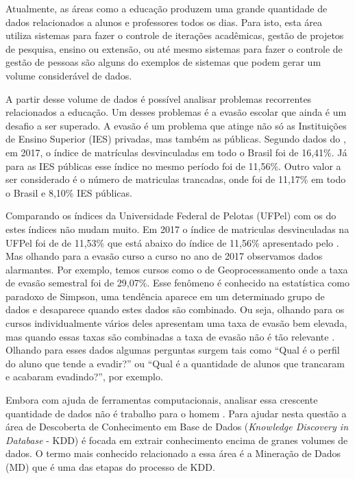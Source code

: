 \documentclass[diss,capa]{texufpel}
\begin{document}
Atualmente, as áreas como a educação produzem uma grande quantidade de dados relacionados a alunos e professores todos os dias.
Para isto, esta área utiliza sistemas para fazer o controle de iterações acadêmicas, gestão de projetos de pesquisa, ensino ou extensão, ou até mesmo sistemas para fazer o controle de gestão de pessoas são alguns do exemplos de sistemas que podem gerar um volume considerável de dados.

A partir desse volume de dados é possível analisar problemas recorrentes relacionados a educação.
Um desses problemas é a evasão escolar que ainda é um desafio a ser superado.
A evasão é um problema que atinge não só as Instituições de Ensino Superior (IES) privadas, mas também as públicas.
Segundo dados do \citet{inep:2018}, em 2017, o índice de matrículas desvinculadas em todo o Brasil foi de 16,41\%.
Já para as IES públicas esse índice no mesmo período foi de 11,56\%.
Outro valor a ser considerado é o número de matriculas trancadas, onde foi de 11,17\% em todo o Brasil e 8,10\% IES públicas.

Comparando os índices da Universidade Federal de Pelotas (UFPel) com os do \citet{inep:2018} estes índices não mudam muito.
Em 2017 o índice de matriculas desvinculadas na UFPel foi de de 11,53\% que está abaixo do índice de 11,56\% apresentado pelo \citet{inep:2018}.
Mas olhando para a evasão curso a curso no ano de 2017 observamos dados alarmantes.
Por exemplo, temos cursos como o de Geoprocessamento onde a taxa de evasão semestral foi de 29,07\%.
Esse fenômeno é conhecido na estatística como paradoxo de Simpson, uma tendência aparece em um determinado grupo de dados e desaparece quando estes dados são combinado.
Ou seja, olhando para os cursos individualmente vários deles apresentam uma taxa de evasão bem elevada, mas quando essas taxas são combinadas a taxa de evasão não é tão relevante \cite{wagner1982simpson}.
Olhando para esses dados algumas perguntas surgem tais como ``Qual é o perfil do aluno que tende a evadir?'' ou ``Qual é a quantidade de alunos que trancaram e acabaram evadindo?'', por exemplo.

Embora com ajuda de ferramentas computacionais, analisar essa crescente quantidade de dados não é trabalho para o homem \cite{goldschmidt2015data}.
Para ajudar nesta questão a área de Descoberta de Conhecimento em Base de Dados (\textit{Knowledge Discovery in Database} - KDD) é focada em extrair conhecimento encima de granes volumes de dados.
O termo mais conhecido relacionado a essa área é a Mineração de Dados (MD) que é uma das etapas do processo de KDD.
\end{document}
